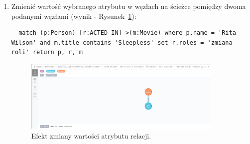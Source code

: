 \documentclass[a4paper,9pt]{extarticle}	%
\begin{document}
\begin{enumerate}
   \newpage
  \item Zmienić wartość wybranego atrybutu w węzłach na ścieżce pomiędzy dwoma podanymi węzłami (wynik - Rysunek~\ref{scrn:6}):
  \begin{lstlisting}
  match (p:Person)-[r:ACTED_IN]->(m:Movie) where p.name = 'Rita Wilson' and m.title contains 'Sleepless' set r.roles = 'zmiana roli' return p, r, m
  \end{lstlisting}
  \begin{figure}[ht]
    \centering
    \includegraphics[width=0.9\textwidth]{screeny/6.png}
    \caption{Efekt zmiany wartości atrybutu relacji.}
    \label{scrn:6}
  \end{figure}
  

\end{enumerate}
\end{document}
